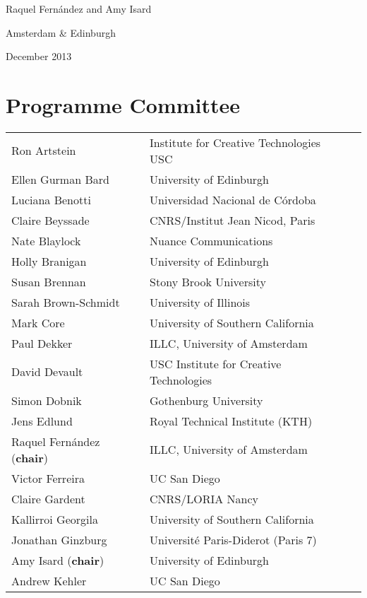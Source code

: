 \documentclass[a4paper,12pt,oneside]{book}
\begin{document}
\vspace{20pt}
\hfill Raquel Fern\'andez and Amy Isard

\hfill Amsterdam \& Edinburgh

\hfill December 2013

\clearpage

\section*{Programme Committee}

\begin{longtable}{@{}p{}p{}p{}}
Ron Artstein & Institute for Creative Technologies USC & \\
Ellen Gurman Bard & University of Edinburgh & \\
Luciana Benotti & Universidad Nacional de C\'ordoba & \\
Claire Beyssade & CNRS/Institut Jean Nicod, Paris & \\
Nate Blaylock & Nuance Communications & \\
Holly Branigan & University of Edinburgh  & \\
Susan Brennan & Stony Brook University & \\
Sarah Brown-Schmidt & University of Illinois & \\
Mark Core & University of Southern California & \\
Paul Dekker & ILLC, University of Amsterdam & \\
David Devault & USC Institute for Creative Technologies & \\
Simon Dobnik & Gothenburg University & \\
Jens Edlund & Royal Technical Institute (KTH) & \\
Raquel Fern\'andez \hfill (\textbf{chair})  & ILLC, University of Amsterdam & \\
Victor Ferreira & UC San Diego & \\
Claire Gardent & CNRS/LORIA Nancy & \\
Kallirroi Georgila & University of Southern California & \\
Jonathan Ginzburg & Universit\'e Paris-Diderot (Paris 7) & \\
Amy Isard \hfill (\textbf{chair})  & University of Edinburgh &\\
Andrew Kehler & UC San Diego & \\

\end{longtable}
\end{document}
